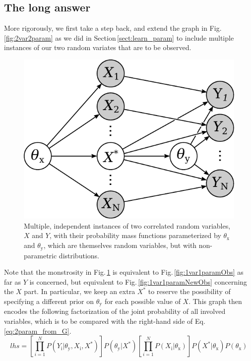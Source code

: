 \documentclass[]{report}
\begin{document}
\subsection{The long answer}
More rigorously, we first take a step back, and extend the graph in Fig.\,\ref{fig:2var2param} as we did in Section\,\ref{sect:learn_param} to include multiple instances of our two random variates that are to be observed.
\begin{figure}[b]
	\centering
	\includegraphics[scale=0.5]{2var_2param_obs}
	\caption{Multiple, independent instances of two correlated random variables, $X$ and $Y$, with their probability mass functions parameterized by $\theta_\mathrm{x}$ and $\theta_\mathrm{y}$, which are themselves random variables, but with non-parametric distributions.}
	\label{fig:2var2paramObs}
\end{figure}
Note that the monstrosity in Fig.\,\ref{fig:2var2paramObs} is equivalent to Fig.\,\ref{fig:1var1paramObs} as far as $Y$ is concerned, but equivalent to Fig.\,\ref{fig:1var1paramNewObs} concerning the $X$ part. In particular, we keep an extra $X^*$ to reserve the possibility of specifying a different prior on $\theta_\mathrm{y}$ for each possible value of $X$. This graph then encodes the following factorization of the joint probability of all involved variables, which is to be compared with the right-hand side of Eq.\,\ref{eq:2param_from_G}.
\begin{equation}
lhs = \left[\prod_{i=1}^{N}P(Y_\mathrm{i}|\theta_\mathrm{y}, X_\mathrm{i}, X^*)\right] P(\theta_\mathrm{y}|X^*) \left[\prod_{i=1}^{N}P(X_\mathrm{i}|\theta_\mathrm{x})\right] P(X^*|\theta_\mathrm{x})P(\theta_\mathrm{x})
\end{equation}
\end{document}
